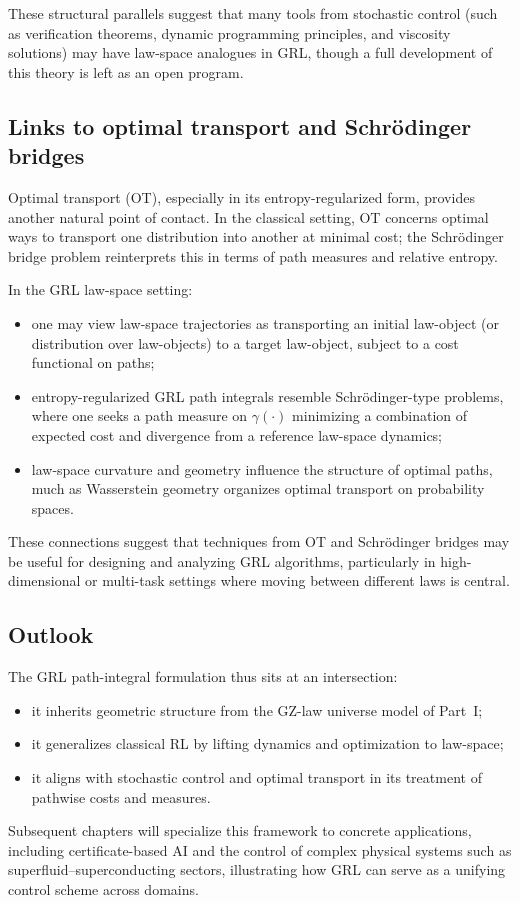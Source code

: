 \documentclass[11pt]{book}
\theoremstyle{plain}
\theoremstyle{definition}
\theoremstyle{remark}
\begin{document}
These structural parallels suggest that many tools from stochastic
control (such as verification theorems, dynamic programming
principles, and viscosity solutions) may have law-space analogues
in GRL, though a full development of this theory is left as an open
program.

\subsection*{Links to optimal transport and Schr\"odinger bridges}

Optimal transport (OT), especially in its entropy-regularized form,
provides another natural point of contact. In the classical setting,
OT concerns optimal ways to transport one distribution into another
at minimal cost; the Schr\"odinger bridge problem reinterprets this
in terms of path measures and relative entropy.

In the GRL law-space setting:
\begin{itemize}
  \item one may view law-space trajectories as transporting an
        initial law-object (or distribution over law-objects) to a
        target law-object, subject to a cost functional on paths;
  \item entropy-regularized GRL path integrals resemble
        Schr\"odinger-type problems, where one seeks a path measure
        on $\gamma(\cdot)$ minimizing a combination of expected cost
        and divergence from a reference law-space dynamics;
  \item law-space curvature and geometry influence the structure of
        optimal paths, much as Wasserstein geometry organizes
        optimal transport on probability spaces.
\end{itemize}

These connections suggest that techniques from OT and Schr\"odinger
bridges may be useful for designing and analyzing GRL algorithms,
particularly in high-dimensional or multi-task settings where
moving between different laws is central.

\subsection*{Outlook}

The GRL path-integral formulation thus sits at an intersection:
\begin{itemize}
  \item it inherits geometric structure from the GZ-law universe
        model of Part~I;
  \item it generalizes classical RL by lifting dynamics and
        optimization to law-space;
  \item it aligns with stochastic control and optimal transport in
        its treatment of pathwise costs and measures.
\end{itemize}
Subsequent chapters will specialize this framework to concrete
applications, including certificate-based AI and the control of
complex physical systems such as superfluid--superconducting
sectors, illustrating how GRL can serve as a unifying control
scheme across domains.
\end{document}
